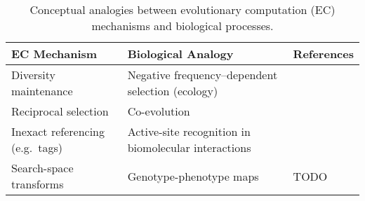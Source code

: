 \begin{table}
\footnotesize

\centering
\caption{Conceptual analogies between evolutionary computation (EC) mechanisms and biological processes.}
\label{tab:bioinspiration}
\renewcommand{\arraystretch}{1.6} %

\begin{tabular}{@{}p{4.2cm}p{4.2cm}p{4.5cm}@{}}
\toprule
\textbf{EC Mechanism} & \textbf{Biological Analogy} & \textbf{References} \\
\midrule
Diversity maintenance & Negative frequency--dependent selection (ecology) & \citep{dolson2018ecological,dolson2018applying} \\
Reciprocal selection & Co-evolution & \citep{lehman2010efficiently,harper2012spatial,garbus2024accelerating,koza1991genetic,kala2012multi,wang2019poet,miikkulainen2024evolving} \\
Inexact referencing (e.g.\ tags) & Active-site recognition in biomolecular interactions & \citep{spector2011tag,moreno2023matchmaker,lalejini2018signalgp,downing2015intelligence} \\
Search-space transforms & Genotype-phenotype maps & \citep{lehman2023evolution,moreno2018learning,bentley2022evolving,gaier2020discovering,wittenberg2023denoising} TODO \\
\bottomrule
\end{tabular}
\end{table}
